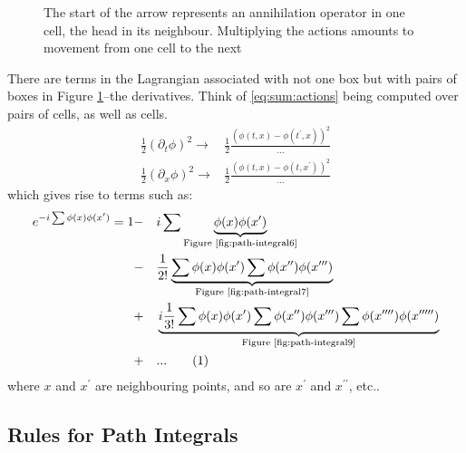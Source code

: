 \documentclass[]{article}
\newcommand\numberthis{\addtocounter{equation}{1}\tag{\theequation}}
\begin{document}
\begin{figure}[H]
	\begin{center}
		\caption[Particle moving from one box to another]{The start of the arrow represents an annihilation operator in one cell, the head in its neighbour. Multiplying the actions amounts to movement from one cell to the next}\label{fig:path-integral3}
	\end{center}
\end{figure}
 
There are terms in the Lagrangian associated with not one box but with pairs of boxes in Figure \ref{fig:path-integral3}--the derivatives. Think of \eqref{eq:sum:actions} being computed over pairs of cells, as well as cells.
\begin{align*}
	\frac{1}{2}(\partial_t \phi)^2 \rightarrow& \frac{1}{2}\frac{(\phi(t,x)-\phi(t^\prime,x))^2}{...}\\
	\frac{1}{2}(\partial_x \phi)^2 \rightarrow& \frac{1}{2}\frac{(\phi(t,x)-\phi(t,x^\prime))^2}{...} 
\end{align*}
which gives rise to terms such as:
\begin{alignat*}{2}
	e^{- i \sum \phi(x) \phi(x^\prime)}=1& -&& i \sum \underbrace{\phi(x) \phi(x^\prime)}_\text{Figure \ref{fig:path-integral6}}\\
	&-&& \frac{1}{2!}\underbrace{\sum \phi(x) \phi(x^\prime)\sum \phi(x^{\prime\prime}) \phi(x^{\prime\prime\prime})}_\text{Figure \ref{fig:path-integral7}}\\
	&+&&\underbrace{i\frac{1}{3!}\sum\phi(x)\phi(x^\prime)\sum\phi(x^{\prime\prime}) \phi(x^{\prime\prime\prime})\sum\phi(x^{\prime\prime\prime\prime}) \phi(x^{\prime\prime\prime\prime\prime})}_\text{Figure \ref{fig:path-integral9}}\\
	&+&& ... \numberthis \label{eq:path:integral:expanded}
\end{alignat*}
where $x$ and $x^{\prime}$ are neighbouring points, and so are $x^{\prime}$ and $x^{\prime\prime}$, etc..

\subsection{Rules for Path Integrals}
\end{document}
